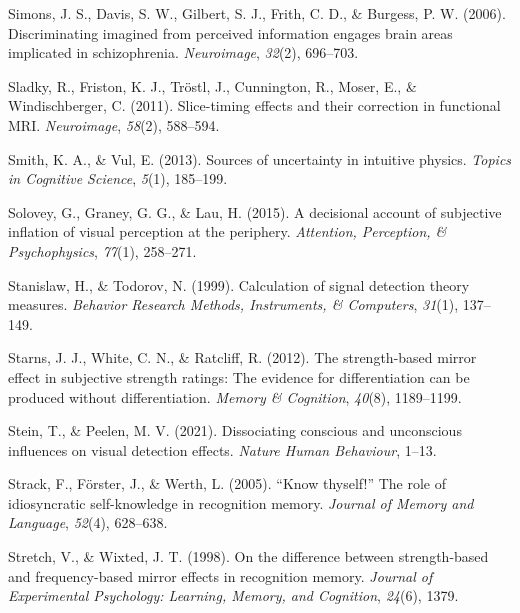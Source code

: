 \documentclass[12pt,twoside]{reedthesis}
\newenvironment{CSLReferences}%
  {}%
  {\par}
\begin{document}
\begin{CSLReferences}{1}{0}
\leavevmode\hypertarget{ref-simons2006discriminating}{}%
Simons, J. S., Davis, S. W., Gilbert, S. J., Frith, C. D., \& Burgess, P. W. (2006). Discriminating imagined from perceived information engages brain areas implicated in schizophrenia. \emph{Neuroimage}, \emph{32}(2), 696--703.

\leavevmode\hypertarget{ref-sladky2011slice}{}%
Sladky, R., Friston, K. J., Tröstl, J., Cunnington, R., Moser, E., \& Windischberger, C. (2011). Slice-timing effects and their correction in functional MRI. \emph{Neuroimage}, \emph{58}(2), 588--594.

\leavevmode\hypertarget{ref-smith2013sources}{}%
Smith, K. A., \& Vul, E. (2013). Sources of uncertainty in intuitive physics. \emph{Topics in Cognitive Science}, \emph{5}(1), 185--199.

\leavevmode\hypertarget{ref-solovey2015decisional}{}%
Solovey, G., Graney, G. G., \& Lau, H. (2015). A decisional account of subjective inflation of visual perception at the periphery. \emph{Attention, Perception, \& Psychophysics}, \emph{77}(1), 258--271.

\leavevmode\hypertarget{ref-stanislaw1999calculation}{}%
Stanislaw, H., \& Todorov, N. (1999). Calculation of signal detection theory measures. \emph{Behavior Research Methods, Instruments, \& Computers}, \emph{31}(1), 137--149.

\leavevmode\hypertarget{ref-starns2012strength}{}%
Starns, J. J., White, C. N., \& Ratcliff, R. (2012). The strength-based mirror effect in subjective strength ratings: The evidence for differentiation can be produced without differentiation. \emph{Memory \& Cognition}, \emph{40}(8), 1189--1199.

\leavevmode\hypertarget{ref-stein2021dissociating}{}%
Stein, T., \& Peelen, M. V. (2021). Dissociating conscious and unconscious influences on visual detection effects. \emph{Nature Human Behaviour}, 1--13.

\leavevmode\hypertarget{ref-strack2005know}{}%
Strack, F., Förster, J., \& Werth, L. (2005). {``Know thyself!''} The role of idiosyncratic self-knowledge in recognition memory. \emph{Journal of Memory and Language}, \emph{52}(4), 628--638.

\leavevmode\hypertarget{ref-stretch1998difference}{}%
Stretch, V., \& Wixted, J. T. (1998). On the difference between strength-based and frequency-based mirror effects in recognition memory. \emph{Journal of Experimental Psychology: Learning, Memory, and Cognition}, \emph{24}(6), 1379.


\end{CSLReferences}
\end{document}
